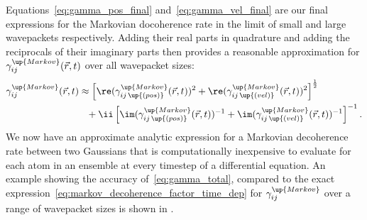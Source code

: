 Equations~\eqref{eq:gamma_pos_final} and~\eqref{eq:gamma_vel_final} are our final expressions for the Markovian docoherence rate in the limit of small and large wavepackets respectively. Adding their real parts in quadrature and adding the reciprocals of their imaginary parts then provides a reasonable approximation for $\gamma_{ij}^\up{Markov}(\vec r, t)$ over all wavepacket sizes:
\begin{align}
\gamma_{ij}^\up{Markov}(\vec r, t) &\approx
\left[\re(\gamma_{ij\,\up{(pos)}}^\up{Markov}(\vec r, t))^2 + \re(\gamma_{ij\,\up{(vel)}}^\up{Markov}(\vec r, t))^2\right]^{\frac12}\nonumber\\
&\phantom{\approx}+ \ii\left[\im(\gamma_{ij\,\up{(pos)}}^\up{Markov}(\vec r, t))^{-1} + \im(\gamma_{ij\,\up{(vel)}}^\up{Markov}(\vec r, t))^{-1}\right]^{-1}.
\label{eq:gamma_total}
\end{align}
We now have an approximate analytic expression for a Markovian decoherence rate between two Gaussians that is computationally inexpensive to evaluate for each atom in an ensemble at every timestep of a differential equation.
An example showing the accuracy of~\eqref{eq:gamma_total}, compared to the exact expression~\eqref{eq:markov_decoherence_factor_time_dep} for $\gamma_{ij}^\up{Markov}$ over a range of wavepacket sizes is shown in .

